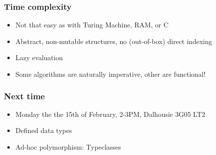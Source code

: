\documentclass[final,handout]{beamer}
\begin{document}
\begin{frame}[fragile]
    \frametitle{Time complexity}

    \begin{itemize}
        \item Not that easy as with Turing Machine, RAM, or C
        \item Abstract, non-mutable structures, no (out-of-box) direct indexing
        \item Lazy evaluation
        \item Some algorithms are naturally imperative, other
            are functional!
    \end{itemize}
\end{frame}

\begin{frame}
    \frametitle{Next time}

    \begin{itemize}
        \item Monday the the 15th of February, 2-3PM,
            Dalhousie 3G05 LT2
        
        \item Defined data types
        \item Ad-hoc polymorphism: Typeclasses

    \end{itemize}

\end{frame}
\end{document}

